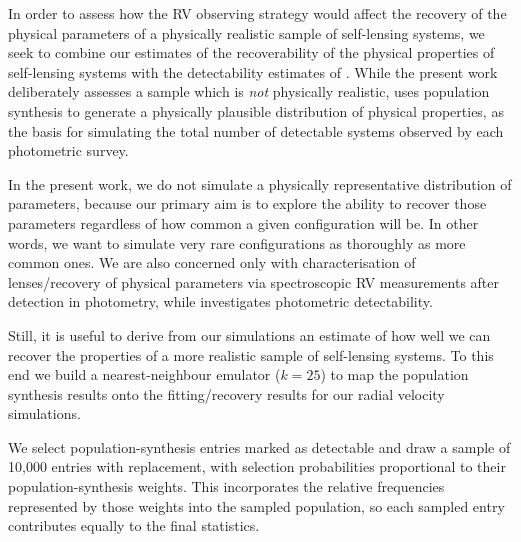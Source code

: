 \documentclass[fleqn,usenatbib]{mnras}
\begin{document}
In order to assess how the RV observing strategy would affect the recovery of the physical parameters of a physically realistic sample of self-lensing systems, we seek to combine our estimates of the recoverability of the physical properties of self-lensing systems with the detectability estimates of \cite{wiktorowicz_predicting_2021}. While the present work deliberately assesses a sample which is \textit{not} physically realistic, \cite{wiktorowicz_predicting_2021} uses population synthesis to generate a physically plausible distribution of physical properties, as the basis for simulating the total number of detectable systems observed by each photometric survey.

In the present work, we do not simulate a physically representative distribution of parameters, because our primary aim is to explore the ability to recover those parameters regardless of how common a given configuration will be. In other words, we want to simulate very rare configurations as thoroughly as more common ones. We are also concerned only with characterisation of lenses/recovery of physical parameters via spectroscopic RV measurements after detection in photometry, while \cite{wiktorowicz_predicting_2021} investigates photometric detectability.

Still, it is useful to derive from our simulations an estimate of how well we can recover the properties of a more realistic sample of self-lensing systems. To this end we build a nearest-neighbour emulator ($k=25$) to map the population synthesis results onto the fitting/recovery results for our radial velocity simulations.

We select population-synthesis entries marked as detectable and draw a sample of 10,000 entries with replacement, with selection probabilities proportional to their population-synthesis weights. This incorporates the relative frequencies represented by those weights into the sampled population, so each sampled entry contributes equally to the final statistics.
\end{document}
